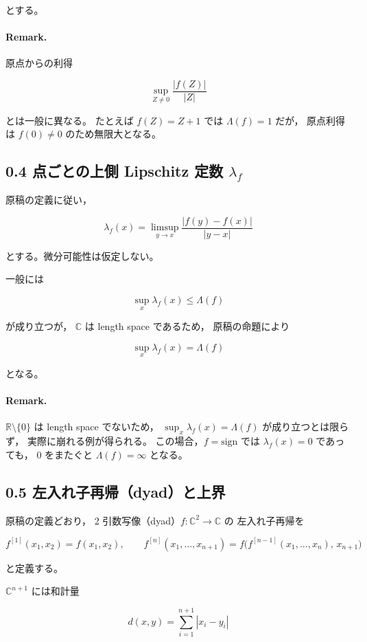 \documentclass[12pt]{article}
\begin{document}
とする。

\paragraph{Remark.}
原点からの利得


\[
\sup_{Z\neq 0}\frac{|f(Z)|}{|Z|}
\]


とは一般に異なる。
たとえば $f(Z)=Z+1$ では $\Lambda(f)=1$ だが，
原点利得は $f(0)\neq 0$ のため無限大となる。

\subsection*{0.4 点ごとの上側 Lipschitz 定数 $\lambda_f$}

原稿の定義に従い，


\[
\lambda_f(x)
= \limsup_{y\to x}\frac{|f(y)-f(x)|}{|y-x|}
\]


とする。微分可能性は仮定しない。

一般には


\[
\sup_x \lambda_f(x) \le \Lambda(f)
\]


が成り立つが，
$\mathbb{C}$ は length space であるため，
原稿の命題により


\[
\sup_x \lambda_f(x) = \Lambda(f)
\]


となる。

\paragraph{Remark.}
$\mathbb{R}\setminus\{0\}$ は length space でないため，
$\sup_x \lambda_f(x) = \Lambda(f)$ が成り立つとは限らず，
実際に崩れる例が得られる。
この場合，$f=\mathrm{sign}$ では $\lambda_f(x)=0$ であっても，
$0$ をまたぐと $\Lambda(f)=\infty$ となる。

\subsection*{0.5 左入れ子再帰（dyad）と上界}

原稿の定義どおり，
2 引数写像（dyad）$f:\mathbb{C}^2\to\mathbb{C}$ の
左入れ子再帰を


\[
f^{[1]}(x_1,x_2)=f(x_1,x_2),\qquad
f^{[n]}(x_1,\dots,x_{n+1})
= f\bigl(f^{[n-1]}(x_1,\dots,x_n),\, x_{n+1}\bigr)
\]


と定義する。

$\mathbb{C}^{n+1}$ には和計量


\[
d(x,y) = \sum_{i=1}^{n+1} |x_i - y_i|
\]
\end{document}
